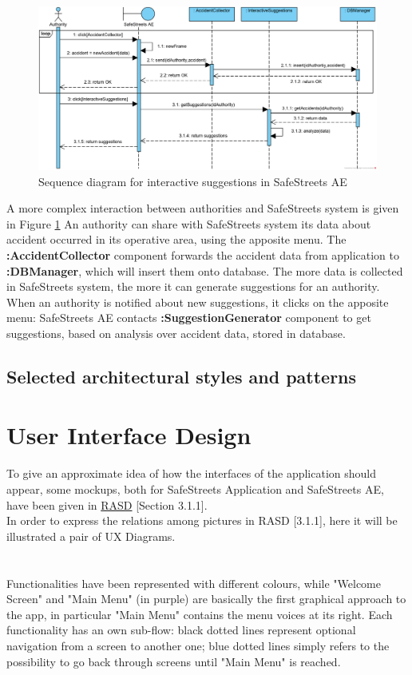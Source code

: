 \documentclass{article}
\begin{document}
			\begin{figure}[H]
				\includegraphics [scale=0.7] {diagrams/DD_SeqD_Suggestions.png}
				\caption[Sequence diagram]{Sequence diagram for interactive suggestions in SafeStreets AE}
				\label{fig:sd-suggestions}
			\end{figure}
		
			A more complex interaction between authorities and SafeStreets system is given in Figure \ref{fig:sd-suggestions}
			An authority can share with SafeStreets system its data about accident occurred in its operative area, using the apposite menu. The \textbf{:AccidentCollector} component forwards the accident data from application to \textbf{:DBManager}, which will insert them onto database.
			The more data is collected in SafeStreets system, the more it can generate suggestions for an authority.\\
			When an authority is notified about new suggestions, it clicks on the apposite menu:  SafeStreets AE contacts \textbf{:SuggestionGenerator} component to get suggestions, based on analysis over accident data, stored in database. 
			
		\subsection{Selected architectural styles and patterns}
	\clearpage	
	\section{User Interface Design}
		To give an approximate idea of how the interfaces of the application should appear, some mockups, both for SafeStreets Application and SafeStreets AE, have been given in \href{run:d:../DeliveryFolder/RASD1.pdf}{RASD} [Section 3.1.1].\\ 
		In order to express the relations among pictures in RASD [3.1.1], here it will be illustrated a pair of UX Diagrams.
		\\\\\\
		Functionalities have been represented with different colours, while "Welcome Screen" and "Main Menu" (in purple) are basically the first graphical approach to the app, in particular "Main Menu" contains the menu voices at its right.
		Each functionality has an own sub-flow: black dotted lines represent optional navigation from a screen to another one; blue dotted lines simply refers to the possibility to go back through screens until "Main Menu" is reached.
		
\end{document}
